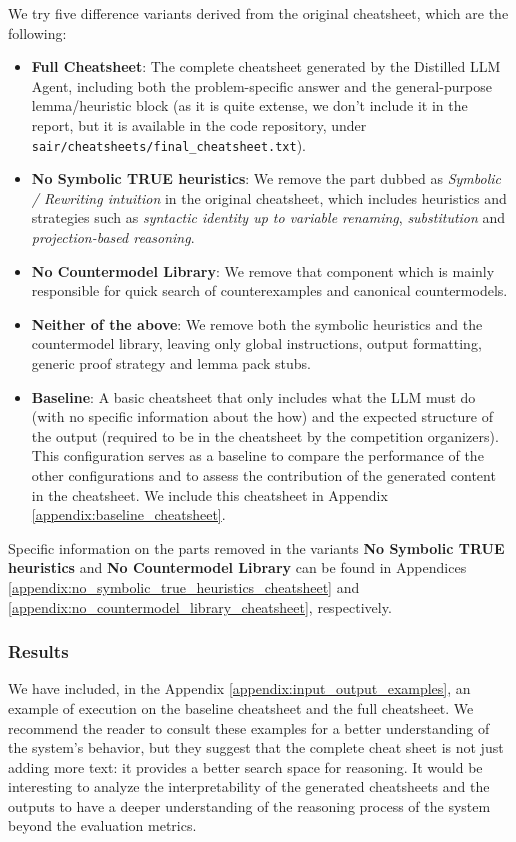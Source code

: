 \documentclass{article}
\begin{document}
We try five difference variants derived from the original cheatsheet, which are the following:
\begin{itemize}
  \item \textbf{Full Cheatsheet}: The complete cheatsheet generated by the Distilled LLM Agent, including both the problem-specific answer and the general-purpose lemma/heuristic block (as it is quite extense, we don't include it in the report, but it is available in the code repository, under \texttt{sair/cheatsheets/final\_cheatsheet.txt}).
  \item \textbf{No Symbolic TRUE heuristics}: We remove the part dubbed as \textit{Symbolic / Rewriting intuition} in the original cheatsheet, which includes heuristics and strategies such as \textit{syntactic identity up to variable renaming}, \textit{substitution} and \textit{projection-based reasoning}.
  \item \textbf{No Countermodel Library}: We remove that component which is mainly responsible for quick search of counterexamples and canonical countermodels.
  \item \textbf{Neither of the above}: We remove both the symbolic heuristics and the countermodel library, leaving only global instructions, output formatting, generic proof strategy and lemma pack stubs.
  \item \textbf{Baseline}: A basic cheatsheet that only includes what the LLM must do (with no specific information about the how) and the expected structure of the output (required to be in the cheatsheet by the competition organizers). This configuration serves as a baseline to compare the performance of the other configurations and to assess the contribution of the generated content in the cheatsheet. We include this cheatsheet in Appendix \ref{appendix:baseline_cheatsheet}.
\end{itemize}
Specific information on the parts removed in the variants \textbf{No Symbolic TRUE heuristics} and \textbf{No Countermodel Library} can be found in Appendices \ref{appendix:no_symbolic_true_heuristics_cheatsheet} and \ref{appendix:no_countermodel_library_cheatsheet}, respectively.

\subsubsection{Results}

We have included, in the Appendix \ref{appendix:input_output_examples}, an example of execution on the baseline cheatsheet and the full cheatsheet. We recommend the reader to consult these examples for a better understanding of the system's behavior, but they suggest that the complete cheat sheet is not just adding more text: it provides a better search space for reasoning. It would be interesting to analyze the interpretability of the generated cheatsheets and the outputs to have a deeper understanding of the reasoning process of the system beyond the evaluation metrics.
\end{document}
